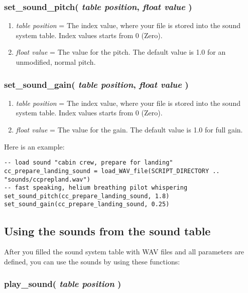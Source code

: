 \documentclass[11pt,parskip=half,a4paper]{scrartcl}
\begin{document}
\subsubsection{ set\_sound\_pitch( \emph{table position}, \emph{float value} )}

\begin{enumerate}
	\item \emph{table position} = The index value, where your file is stored into the sound system table. Index values starts from 0 (Zero).
	\item \emph{float value} = The value for the pitch. The default value is 1.0 for an unmodified, normal pitch.
\end{enumerate}

\subsubsection{ set\_sound\_gain( \emph{table position}, \emph{float value} )}

\begin{enumerate}
	\item \emph{table position} = The index value, where your file is stored into the sound system table. Index values starts from 0 (Zero).
	\item \emph{float value} = The value for the gain. The default value is 1.0 for full gain.
\end{enumerate}

Here is an example:

\begin{lstlisting}
-- load sound "cabin crew, prepare for landing"
cc_prepare_landing_sound = load_WAV_file(SCRIPT_DIRECTORY .. "sounds/ccprepland.wav")
-- fast speaking, helium breathing pilot whispering
set_sound_pitch(cc_prepare_landing_sound, 1.8)
set_sound_gain(cc_prepare_landing_sound, 0.25)
\end{lstlisting}

\newpage
\subsection{Using the sounds from the sound table}

After you filled the sound system table with WAV files and all parameters are defined, you can use the sounds by using these functions:

\subsubsection{ play\_sound( \emph{table position} )}
\end{document}
